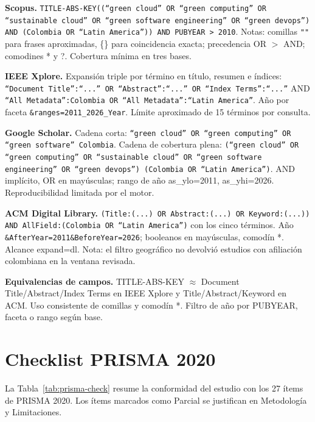 \documentclass[conference]{IEEEtran}
\begin{document}
\textbf{Scopus.} \texttt{TITLE-ABS-KEY((``green cloud'' OR ``green computing'' OR ``sustainable cloud'' OR ``green software engineering'' OR ``green devops'') AND (Colombia OR ``Latin America'')) AND PUBYEAR > 2010}. Notas: comillas \texttt{""} para frases aproximadas, \{\} para coincidencia exacta; precedencia OR $>$ AND; comodines * y ?. Cobertura m\'inima en tres bases.

\textbf{IEEE Xplore.} Expansi\'on triple por t\'ermino en t\'itulo, resumen e \'{i}ndices: \texttt{``Document Title'':``...'' OR ``Abstract'':``...'' OR ``Index Terms'':``...''} AND \texttt{``All Metadata'':Colombia OR ``All Metadata'':``Latin America''}. Año por faceta \texttt{\&ranges=2011\_2026\_Year}. L\'imite aproximado de 15 t\'erminos por consulta.

\textbf{Google Scholar.} Cadena corta: \texttt{``green cloud'' OR ``green computing'' OR ``green software'' Colombia}. Cadena de cobertura plena: \texttt{(``green cloud'' OR ``green computing'' OR ``sustainable cloud'' OR ``green software engineering'' OR ``green devops'') (Colombia OR ``Latin America'')}. AND impl\'icito, OR en may\'usculas; rango de año as\_ylo=2011, as\_yhi=2026. Reproducibilidad limitada por el motor.

\textbf{ACM Digital Library.} \texttt{(Title:(...) OR Abstract:(...) OR Keyword:(...)) AND AllField:(Colombia OR ``Latin America'')} con los cinco t\'erminos. Año \texttt{\&AfterYear=2011\&BeforeYear=2026}; booleanos en may\'usculas, comod\'in *. Alcance expand=dl. Nota: el filtro geogr\'afico no devolvi\'o estudios con afiliaci\'on colombiana en la ventana revisada.

\textbf{Equivalencias de campos.} TITLE-ABS-KEY $\approx$ Document Title/Abstract/Index Terms en IEEE Xplore y Title/Abstract/Keyword en ACM. Uso consistente de comillas y comod\'in *. Filtro de año por PUBYEAR, faceta o rango seg\'un base.
\section{Checklist PRISMA 2020}\label{app:prisma}
La Tabla~\ref{tab:prisma-check} resume la conformidad del estudio con los 27 ítems de PRISMA 2020. Los ítems marcados como Parcial se justifican en Metodología y Limitaciones.
\end{document}
